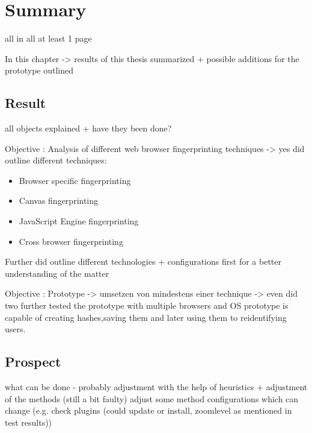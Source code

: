 \chapter{Summary}
\label{cha:summary}
all in all at least 1 page


In this chapter -> results of this thesis summarized + possible additions for the prototype outlined

\section{Result}
all objects explained + have they been done?

Objective : Analysis of different web browser fingerprinting techniques
 -> yes did outline different techniques:
\begin{itemize}
	\item Browser specific fingerprinting
	\item Canvas fingerprinting
	\item JavaScript Engine fingerprinting
	\item Cross browser fingerprinting
\end{itemize}
Further did outline different technologies + configurations first for a better understanding of the matter

Objective : Prototype
-> umsetzen von mindestens einer technique -> even did two
further tested the prototype with multiple browsers and OS
prototype is capable of creating hashes,saving them and later using them to reidentifying users.


\section{Prospect}
what can be done - probably adjustment with the help of heuristics + adjustment of the methods (still a bit faulty)
adjust some method configurations which can change (e.g. check plugins (could update or install, zoomlevel as mentioned in test results))

